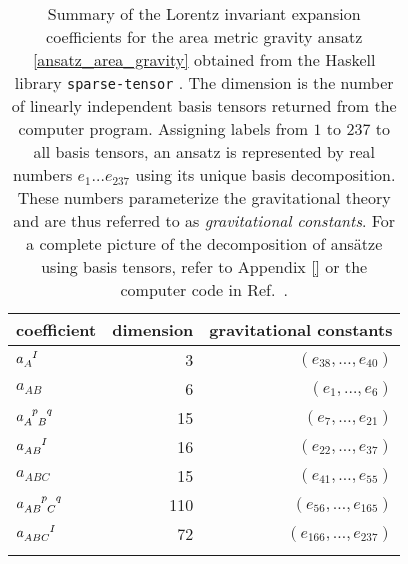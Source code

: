 \begin{table}
  \centering
  \begin{tabular}{l r r}
    \toprule
    coefficient & dimension & gravitational constants \\
    \midrule
    $a_A^{\hphantom AI}$ & 3 & $(e_{38},\dots ,e_{40})$ \\ \addlinespace[2pt]
    $a_{AB}$ & 6 & $(e_{1},\dots ,e_{6})$ \\ \addlinespace[2pt]
    $a_{A\hphantom pB}^{\hphantom Ap\hphantom Bq}$ & 15 & $(e_{7},\dots ,e_{21})$ \\ \addlinespace[2pt]
    $a_{AB}^{\hphantom{AB}I}$ & 16 & $(e_{22},\dots ,e_{37})$ \\ \addlinespace[2pt]
    $a_{ABC}$ & 15 & $(e_{41},\dots ,e_{55})$ \\ \addlinespace[2pt]
    $a_{AB\hphantom pC}^{\hphantom{AB}p\hphantom Cq}$ & 110 & $(e_{56},\dots ,e_{165})$ \\ \addlinespace[2pt]
    $a_{ABC}^{\hphantom{ABC}I}$ & 72 & $(e_{166},\dots ,e_{237})$ \\ \addlinespace[2pt]
    \bottomrule 
  \end{tabular}
  \caption{Summary of the Lorentz invariant expansion coefficients for the area metric gravity ansatz \eqref{ansatz_area_gravity} obtained from the Haskell library \texttt{sparse-tensor} \cite{}. The dimension is the number of linearly independent basis tensors returned from the computer program. Assigning labels from $1$ to $237$ to all basis tensors, an ansatz is represented by real numbers $e_1\dots e_{237}$ using its unique basis decomposition. These numbers parameterize the gravitational theory and are thus referred to as \emph{gravitational constants}. For a complete picture of the decomposition of ansätze using basis tensors, refer to Appendix \ref{} or the computer code in Ref.~\cite{Alex_2020_area-metric-gravity}.}
\end{table}

